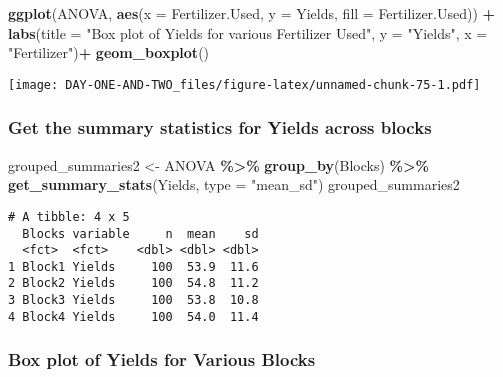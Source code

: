\documentclass[
]{article}
\newenvironment{Shaded}{\begin{snugshade}}{\end{snugshade}}
\newcommand{\AttributeTok}[1]{\textcolor[rgb]{0.13,0.29,0.53}{#1}}
\newcommand{\FunctionTok}[1]{\textcolor[rgb]{0.13,0.29,0.53}{\textbf{#1}}}
\newcommand{\NormalTok}[1]{#1}
\newcommand{\OtherTok}[1]{\textcolor[rgb]{0.56,0.35,0.01}{#1}}
\newcommand{\SpecialCharTok}[1]{\textcolor[rgb]{0.81,0.36,0.00}{\textbf{#1}}}
\newcommand{\StringTok}[1]{\textcolor[rgb]{0.31,0.60,0.02}{#1}}
\begin{document}
\begin{Shaded}
\begin{Highlighting}[]
\FunctionTok{ggplot}\NormalTok{(ANOVA, }\FunctionTok{aes}\NormalTok{(}\AttributeTok{x =}\NormalTok{ Fertilizer.Used, }\AttributeTok{y =}\NormalTok{ Yields, }\AttributeTok{fill =}\NormalTok{ Fertilizer.Used)) }\SpecialCharTok{+}
  \FunctionTok{labs}\NormalTok{(}\AttributeTok{title =} \StringTok{"Box plot of Yields for various Fertilizer Used"}\NormalTok{, }\AttributeTok{y =} \StringTok{"Yields"}\NormalTok{, }\AttributeTok{x =} \StringTok{"Fertilizer"}\NormalTok{)}\SpecialCharTok{+}
  \FunctionTok{geom\_boxplot}\NormalTok{()}
\end{Highlighting}
\end{Shaded}

\texttt{[image: DAY-ONE-AND-TWO\_files/figure-latex/unnamed-chunk-75-1.pdf]}

\hypertarget{get-the-summary-statistics-for-yields-across-blocks}{%
\subsubsection{Get the summary statistics for Yields across
blocks}\label{get-the-summary-statistics-for-yields-across-blocks}}

\begin{Shaded}
\begin{Highlighting}[]
\NormalTok{grouped\_summaries2 }\OtherTok{\textless{}{-}}\NormalTok{ ANOVA }\SpecialCharTok{\%\textgreater{}\%}
  \FunctionTok{group\_by}\NormalTok{(Blocks) }\SpecialCharTok{\%\textgreater{}\%}
  \FunctionTok{get\_summary\_stats}\NormalTok{(Yields, }\AttributeTok{type =} \StringTok{"mean\_sd"}\NormalTok{)}
\NormalTok{grouped\_summaries2}
\end{Highlighting}
\end{Shaded}

\begin{verbatim}
# A tibble: 4 x 5
  Blocks variable     n  mean    sd
  <fct>  <fct>    <dbl> <dbl> <dbl>
1 Block1 Yields     100  53.9  11.6
2 Block2 Yields     100  54.8  11.2
3 Block3 Yields     100  53.8  10.8
4 Block4 Yields     100  54.0  11.4
\end{verbatim}

\hypertarget{box-plot-of-yields-for-various-blocks}{%
\subsubsection{Box plot of Yields for Various
Blocks}\label{box-plot-of-yields-for-various-blocks}}
\end{document}
